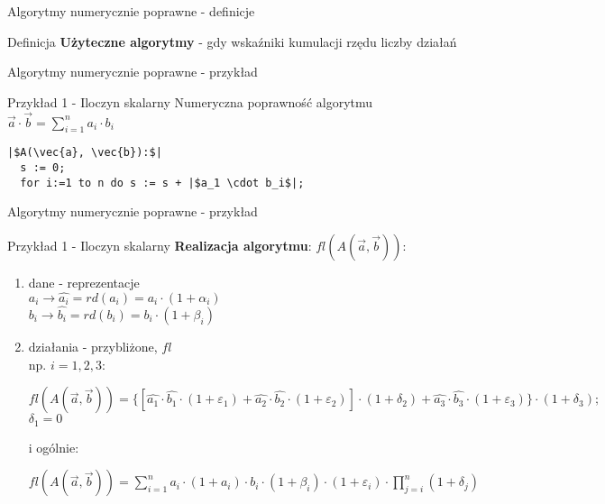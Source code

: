 \begin{frame}{Algorytmy numerycznie poprawne - definicje}
	\begin{block}{Definicja}
		{\bf Użyteczne algorytmy} - gdy wskaźniki kumulacji rzędu liczby działań
	\end{block}
\end{frame}
\begin{frame}[fragile]{Algorytmy numerycznie poprawne - przykład}
	\begin{exampleblock}{Przykład 1 - Iloczyn skalarny}
		Numeryczna poprawność algorytmu $\vec{a} \cdot \vec{b} = \sum_{i=1}^{n} a_i \cdot b_i$
        
\begin{lstlisting}[escapechar=|]
  |$A(\vec{a}, \vec{b}):$|
  s := 0;
  for i:=1 to n do s := s + |$a_1 \cdot b_i$|;
\end{lstlisting}
	\end{exampleblock}
\end{frame}
\begin{frame}{Algorytmy numerycznie poprawne - przykład}
	\begin{exampleblock}{Przykład 1 - Iloczyn skalarny }
		{\bf Realizacja algorytmu}: $fl(A(\vec{a}, \vec{b}))$:
        \begin{enumerate}
        	\item dane - reprezentacje \\
                \hspace{1cm} $a_i \to \hat{a_i} = rd(a_i) = a_i \cdot (1 + \alpha_i)$ \\
                \hspace{1cm} $b_i \to \hat{b_i} = rd(b_i) = b_i \cdot (1 + \beta_i)$
        	\item działania - przybliżone, $fl$ \\
            	np. $i = 1, 2, 3:$ \\ 
                \begin{addmargin}[1em]{0em}
                $
                    fl(A(\vec{a}, \vec{b})) = \{
                        [
                            \hat{a_1} \cdot \hat{b_1} \cdot (1 + \varepsilon_1) +
                            \hat{a_2} \cdot \hat{b_2} \cdot (1 + \varepsilon_2)  
                        ]
                        \cdot (1 + \delta_2) + \hat{a_3} \cdot \hat{b_3} \cdot (1 + \varepsilon_3)
                    \} \cdot (1 + \delta_3); 
                $ \\
                $\delta_1 = 0$ \\
                
                \end{addmargin}
            	i ogólnie:
                \begin{addmargin}[1em]{0em}
                $
                	fl(A(\vec{a}, \vec{b})) =
                	\sum_{i=1}^{n} a_i \cdot (1+a_i) \cdot 
                    b_i \cdot (1 + \beta_i) \cdot (1 + \varepsilon_i)
                    \cdot \prod_{j=i}^{n} (1 + \delta_j)
                $                
                \end{addmargin}
        \end{enumerate}
	\end{exampleblock}
\end{frame}
